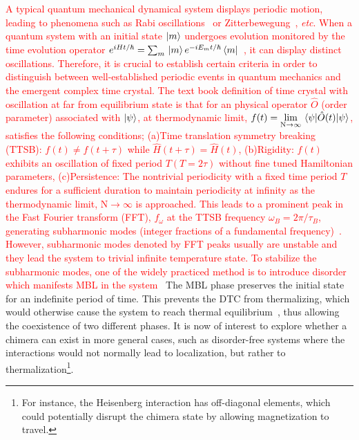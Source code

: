 \documentclass[12pt]{iopart}
\newcommand{\red}[1]{\textcolor{red}{#1}}
\begin{document}
\red{A typical quantum mechanical dynamical system displays periodic motion, leading to phenomena such as Rabi oscillations~\cite{Sakurai_Napolitano_2020} or Zitterbewegung~\cite{LeBlanc_2013}, \textit{etc}. When a quantum system with an initial state $\ket{m}$ undergoes evolution monitored by the time evolution operator $e^{i H t / \hbar} = \sum_m \ket*{m}e^{-i E_m t/\hbar}\bra*{m}$~\cite{Biao2018,russomanno_floquet_2017}, it can display distinct oscillations. Therefore, it is crucial to establish certain criteria in order to distinguish between well-established periodic events in quantum mechanics and the emergent complex time crystal. The text book definition of time crystal with oscillation at far from equilibrium state is that for an physical operator $\hat{O}$ (order parameter) associated with $\ket{\psi}$, at thermodynamic limit, 
$\displaystyle f(t) = \lim_{\mathrm{N}\to\infty}\expval{\hat{O}(t)}{\psi}$,
satisfies the following conditions; (a)Time translation symmetry breaking (TTSB): $f(t) \neq f(t+\tau)$ while $\hat{H}(t + \tau) =  \hat{H}(t)$, (b)Rigidity: $f(t)$ exhibits an oscillation of fixed period $T (T=2\tau)$ without fine tuned Hamiltonian parameters,
 (c)Persistence: The nontrivial periodicity with a fixed time period $ T $ endures for a sufficient duration to maintain periodicity at infinity as the thermodynamic limit, $\mathrm{N} \rightarrow \infty$ is approached. This leads to a prominent peak in the Fast Fourier transform (FFT), $f_\omega$ at the TTSB frequency $\omega_B =2\pi/\tau_B$, generating subharmonic modes (integer fractions of a fundamental frequency)~\cite{Biao2018, russomanno_floquet_2017}. However, subharmonic modes denoted by FFT peaks usually are unstable and they lead the system to trivial infinite temperature state. To stabilize the subharmonic modes, one of the widely practiced method is to introduce  disorder which manifests MBL in the system~\cite{zhang_observation_2017, choi_observation_2017, Khemani2016,else_discrete_2020}} The MBL phase preserves the initial state for an indefinite period of time. This prevents the DTC from thermalizing, which would otherwise cause the system to reach thermal equilibrium~\cite{zhang_observation_2017,alet_many-body_2018,else_floquet_2016,smith_many-body_2016,nguyen_signature_2021}, thus allowing the coexistence of two different phases. It is now of interest to explore whether a chimera can exist in more general cases, such as disorder-free systems where the interactions would not normally lead to localization, but rather to thermalization\footnote{For instance, the Heisenberg interaction has off-diagonal elements, which could potentially disrupt the chimera state by allowing magnetization to travel.}.
\end{document}
